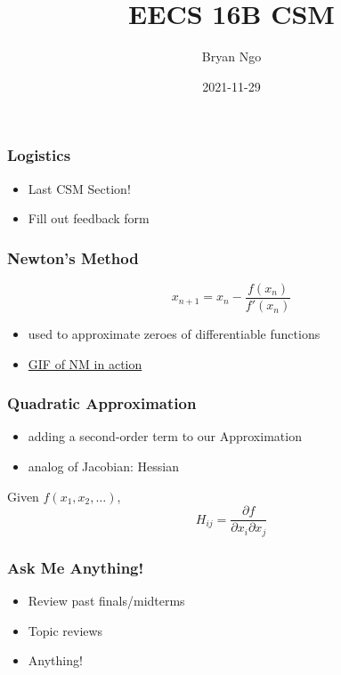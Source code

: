 \documentclass[aspectratio=169]{beamer}
\title{EECS 16B CSM}
\author{Bryan Ngo}
\date{2021-11-29}
\institute{UC Berkeley}
\begin{document}
\begin{frame}
    \maketitle
\end{frame}

\begin{frame}
    \frametitle{Logistics}

    \begin{itemize}
        \item Last CSM Section!
        \item Fill out feedback form
    \end{itemize}
\end{frame}

\begin{frame}
    \frametitle{Newton's Method}

    \begin{equation}
        x_{n + 1} = x_n - \frac{f(x_n)}{f'(x_n)}
    \end{equation}
    \begin{itemize}
        \item used to approximate zeroes of differentiable functions
        \item \href{https://upload.wikimedia.org/wikipedia/commons/e/e0/NewtonIteration_Ani.gif}{GIF of NM in action}
    \end{itemize}
\end{frame}

\begin{frame}
    \frametitle{Quadratic Approximation}

    \begin{itemize}
        \item adding a second-order term to our Approximation
        \item analog of Jacobian: Hessian
    \end{itemize}
    Given \(f(x_1, x_2, \ldots)\),
    \begin{equation}
        H_{ij} = \frac{\partial f}{\partial x_i \partial x_j}
    \end{equation}
\end{frame}

\begin{frame}
    \frametitle{Ask Me Anything!}

    \begin{itemize}
        \item Review past finals/midterms
        \item Topic reviews
        \item Anything!
    \end{itemize}
\end{frame}
\end{document}
